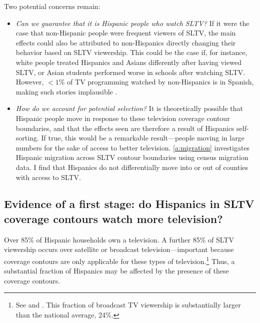 \documentclass[11pt]{article}
\begin{document}
Two potential concerns remain:
\begin{itemize}
\item \textit{Can we guarantee that it is Hispanic people who watch SLTV?} If it were the case that non-Hispanic people were frequent viewers of SLTV, the main effects could also be attributed to non-Hispanics directly changing their behavior based on SLTV viewership. This could be the case if, for instance, white people treated Hispanics and Asians differently after having viewed SLTV, or Asian students performed worse in schools after watching SLTV. However,  $<1\%$ of TV programming watched by non-Hispanics is in Spanish, making such stories implausible \citep{noauthor_hispanic_2016}.

\item \textit{How do we account for potential selection?} It is theoretically possible that Hispanic people move in response to these television coverage contour boundaries, and that the effects seen are therefore a result of Hispanics self-sorting. If true, this would be a remarkable result---people moving in large numbers for the sake of access to better television. \ref{a:migration} investigates Hispanic migration across SLTV contour boundaries using census migration data. I find that Hispanics do not differentially move into or out of counties with access to SLTV.  



\end{itemize}




\subsection{Evidence of a first stage: do Hispanics in SLTV coverage contours watch more television?}

Over 85\% of Hispanic households own a television. A further 85\% of SLTV viewership occurs over satellite or broadcast television---important because coverage contours are only applicable for these types of television.\footnote{ See \cite{noauthor_hispanic_2016} and \cite{de_la_merced_att_2014}. This fraction of broadcast TV viewership is substantially larger than the national average, 24\%.} Thus, a substantial fraction of Hispanics may be affected by the presence of these coverage contours.
\end{document}

